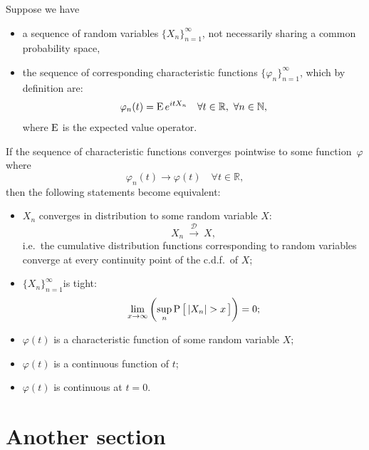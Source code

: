 \documentclass{somasmsc}
\begin{document}
\begin{theorem}\label{theorem:levyct}
 Suppose we have
\begin{itemize}
\item a sequence of random variables $\{X_n\}_{n=1}^\infty$, not necessarily sharing a common probability space,
\item the sequence of corresponding characteristic functions $\{\varphi_n\}_{n=1}^\infty$, which by definition are:
$$
\varphi_n(t) = \operatorname{E} e^{itX_n} \quad \forall t\in\mathbb{R},\ \forall n\in\mathbb{N},
$$
where $\operatorname{E}$ is the expected value operator.
\end{itemize}
If the sequence of characteristic functions converges pointwise to some function~$\varphi$ where
$$\varphi_n(t)\to\varphi(t) \quad \forall t\in\mathbb{R},$$
then the following statements become equivalent:
\begin{itemize}
\item $X_n$ converges in distribution to some random variable $X$:
$$X_n\ \xrightarrow{\mathcal D}\ X,$$
i.e.\ the cumulative distribution functions corresponding to random variables converge at every continuity point of the c.d.f.\ of $X$;
\item $\{X_n\}_{n=1}^\infty$is tight:
$$\lim_{x\to\infty}\left( \sup_n \Prob\big[\, |X_n|>x \,\big]\right) = 0;$$
\item $\varphi(t)$ is a characteristic function of some random variable $X$;
\item $\varphi(t)$ is a continuous function of $t$;
\item $\varphi(t)$ is continuous at $t=0$.
\end{itemize}
\end{theorem}

\section{Another section}
\end{document}
